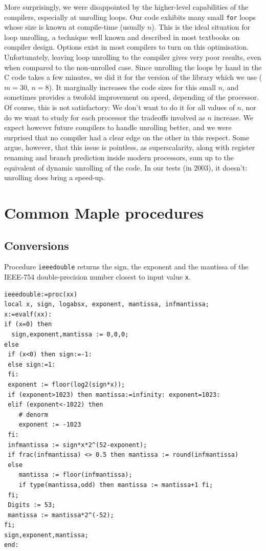 More surprisingly, we were disappointed by the higher-level
capabilities of the compilers, especially at unrolling loops. Our code
exhibits many small \texttt{for} loops whose size is known at
compile-time (usually $n$). This is the ideal situation for loop
unrolling, a technique well known and described in most textbooks on
compiler design. Options exist in most compilers to turn on this
optimisation. Unfortunately, leaving loop unrolling to the compiler
gives very poor results, even when compared to the non-unrolled case.
Since unrolling the loops by hand in the C code takes a few minutes,
we did it for the version of the library which we use ($m=30$, $n=8$).
It marginally increases the code sizes for this small $n$, and
sometimes provides a twofold improvement on speed, depending of the
processor. Of course, this is not satisfactory: We don't want to do it
for all values of $n$, nor do we want to study for each processor the
tradeoffs involved as $n$ increase. We expect however future compilers
to handle unrolling better, and we were surprised that no compiler had
a clear edge on the other in this respect. Some argue, however, that
this issue is pointless, as superscalarity, along with register
renaming and branch prediction inside modern processors, sum up to the
equivalent of dynamic unrolling of the code. In our tests (in 2003), it
doesn't: unrolling does bring a speed-up.








\section{Common Maple procedures \label{section:commonMaple}}


\subsection{Conversions}





Procedure \texttt{ieeedouble} returns the sign, the exponent and the
mantissa of the IEEE-754 double-precision number closest to input
value \texttt{x}.

\begin{lstlisting}[caption={ieeedouble},firstnumber=1]
ieeedouble:=proc(xx) 
local x, sign, logabsx, exponent, mantissa, infmantissa; 
x:=evalf(xx):
if (x=0) then 
  sign,exponent,mantissa := 0,0,0; 
else 
 if (x<0) then sign:=-1:
 else sign:=1:
 fi:
 exponent := floor(log2(sign*x));
 if (exponent>1023) then mantissa:=infinity: exponent=1023:
 elif (exponent<-1022) then 
    # denorm
    exponent := -1023
 fi:
 infmantissa := sign*x*2^(52-exponent);
 if frac(infmantissa) <> 0.5 then mantissa := round(infmantissa)
 else
    mantissa := floor(infmantissa);
    if type(mantissa,odd) then mantissa := mantissa+1 fi;
 fi;
 Digits := 53;
 mantissa := mantissa*2^(-52);
fi;
sign,exponent,mantissa;
end:
\end{lstlisting}

